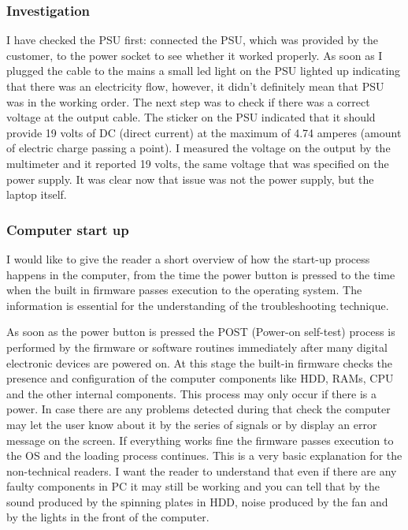 \documentclass[10pt,a4paper,headinclude=true]{report}
\begin{document}
\subsubsection{Investigation}
I have checked the PSU first: connected the PSU, which was provided by the customer, to the power socket to see whether it worked properly. As soon as I plugged the cable to the mains a small led light on the PSU lighted up indicating that there was an electricity flow, however, it didn't definitely mean that PSU was in the working order. The next step was to check if there was a correct voltage at the output cable. The sticker on the PSU indicated that it should provide 19 volts of DC (direct current) at the maximum of 4.74 amperes (amount of electric charge passing a point). I measured the voltage on the output by the multimeter and it reported 19 volts, the same voltage that was specified on the power supply. It was clear now that issue was not the power supply, but the laptop itself.  
\subsubsection{Computer start up}
I would like to give the reader a short overview of how the start-up process happens in the computer, from the time the power button is pressed to the time when the built in firmware passes execution to the operating system. The information is essential for the understanding of the troubleshooting technique.  

As soon as the power button is pressed the POST (Power-on self-test) process is performed by the firmware or software routines immediately after many digital electronic devices are powered on\cite{POST}. At this stage the built-in firmware checks the presence and configuration of the computer components like HDD, RAMs, CPU and the other internal components. This process may only occur if there is a power. In case there are any problems detected during that check the computer may let the user know about it by the series of signals or by display an error message on the screen. If everything works fine the firmware passes execution to the OS and the loading process continues. This is a very basic explanation for the non-technical readers. I want the reader to understand that even if there are any faulty components in PC it may still be working and you can tell that by the sound produced by the spinning plates in HDD, noise produced by the fan and by the lights in the front of the computer.
\end{document}
